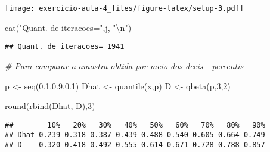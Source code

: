 \documentclass[
]{article}
\newenvironment{Shaded}{\begin{snugshade}}{\end{snugshade}}
\newcommand{\CommentTok}[1]{\textcolor[rgb]{0.56,0.35,0.01}{\textit{#1}}}
\newcommand{\DecValTok}[1]{\textcolor[rgb]{0.00,0.00,0.81}{#1}}
\newcommand{\FloatTok}[1]{\textcolor[rgb]{0.00,0.00,0.81}{#1}}
\newcommand{\FunctionTok}[1]{\textcolor[rgb]{0.00,0.00,0.00}{#1}}
\newcommand{\NormalTok}[1]{#1}
\newcommand{\OtherTok}[1]{\textcolor[rgb]{0.56,0.35,0.01}{#1}}
\newcommand{\SpecialCharTok}[1]{\textcolor[rgb]{0.00,0.00,0.00}{#1}}
\newcommand{\StringTok}[1]{\textcolor[rgb]{0.31,0.60,0.02}{#1}}
\begin{document}
\texttt{[image: exercicio-aula-4\_files/figure-latex/setup-3.pdf]}

\begin{Shaded}
\begin{Highlighting}[]
\FunctionTok{cat}\NormalTok{(}\StringTok{"Quant. de iteracoes="}\NormalTok{,j, }\StringTok{"}\SpecialCharTok{\textbackslash{}n}\StringTok{"}\NormalTok{)}
\end{Highlighting}
\end{Shaded}

\begin{verbatim}
## Quant. de iteracoes= 1941
\end{verbatim}

\begin{Shaded}
\begin{Highlighting}[]
\CommentTok{\# Para comparar a amostra obtida por meio dos decis {-} percentis}

\NormalTok{p }\OtherTok{\textless{}{-}} \FunctionTok{seq}\NormalTok{(}\FloatTok{0.1}\NormalTok{,}\FloatTok{0.9}\NormalTok{,}\FloatTok{0.1}\NormalTok{)}
\NormalTok{Dhat }\OtherTok{\textless{}{-}} \FunctionTok{quantile}\NormalTok{(x,p)}
\NormalTok{D }\OtherTok{\textless{}{-}} \FunctionTok{qbeta}\NormalTok{(p,}\DecValTok{3}\NormalTok{,}\DecValTok{2}\NormalTok{)}

\FunctionTok{round}\NormalTok{(}\FunctionTok{rbind}\NormalTok{(Dhat, D),}\DecValTok{3}\NormalTok{)}
\end{Highlighting}
\end{Shaded}

\begin{verbatim}
##        10%   20%   30%   40%   50%   60%   70%   80%   90%
## Dhat 0.239 0.318 0.387 0.439 0.488 0.540 0.605 0.664 0.749
## D    0.320 0.418 0.492 0.555 0.614 0.671 0.728 0.788 0.857
\end{verbatim}
\end{document}
